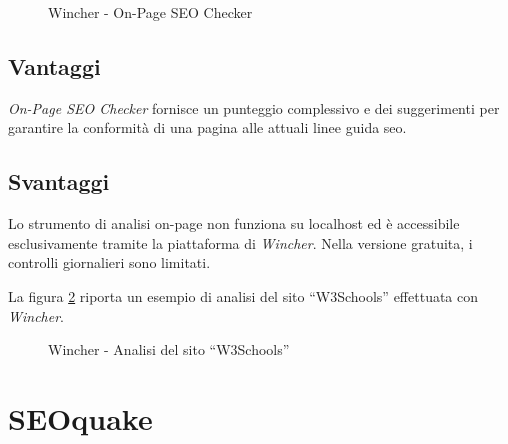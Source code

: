 \begin{figure}[H]
    \centering 
    \caption{Wincher - On-Page SEO Checker}
    \label{fig:on_page_seo_checker}
\end{figure}

\subsection{Vantaggi}
\par \textit{On-Page SEO Checker} fornisce un punteggio complessivo e dei suggerimenti per garantire la conformità di una pagina alle attuali linee guida \gls{seo}.

\subsection{Svantaggi}
\par Lo strumento di analisi \gls{on-page} non funziona su \gls{localhost} ed è accessibile esclusivamente tramite la piattaforma di \textit{Wincher}. Nella versione gratuita, i controlli giornalieri sono limitati.

\vspace{15pt}
\par\noindent La figura \ref{fig:wincher_w3schools} riporta un esempio di analisi del sito “W3Schools” effettuata con \textit{Wincher}.

\begin{figure}[H]
    \centering 
    \caption{Wincher - Analisi del sito “W3Schools”}
    \label{fig:wincher_w3schools}
\end{figure}

\section{SEOquake}

